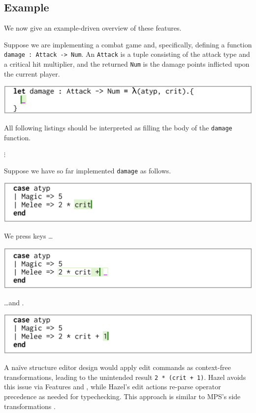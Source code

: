 \documentclass[format=sigplan,dvipsnames,backend=bibtex]{acmart}
\newcommand{\Hazel}{\textsf{Hazel}\xspace}
\newcommand{\key}[1]{\fbox{\texttt{#1}}}
\begin{document}
\subsection{Example}

We now give an example-driven overview of these features.


Suppose we are implementing a combat game and, specifically, defining a function
	\texttt{damage : Attack -> Num}. An \texttt{Attack} is a tuple consisting of the
	attack type and a critical hit multiplier, and the returned \texttt{Num} is the
	damage points inflicted upon the current player.
	
{\centering
  \includegraphics[width=\linewidth]{fig/context.png}\par
}
\noindent
All following listings should be interpreted as filling the body of the \texttt{damage} function.

{\centering
	\vspace{-0.1cm}
  $\vdots$\par
  \vspace{0.1cm}
}
\noindent
Suppose we have so far implemented \texttt{damage} as follows.

{\centering
  \includegraphics[width=\linewidth]{fig/frame1.png}\par
}
\noindent
We press keys \key{+} \ldots

{\centering
  \includegraphics[width=\linewidth]{fig/frame1-5.png}\par
}
\noindent
\ldots and \key{1}.

{\centering
  \includegraphics[width=\linewidth]{fig/frame2.png}\par
}
\noindent
A naïve structure editor design would apply edit commands as context-free transformations,
	leading to the unintended result \texttt{2 * (crit + 1)}.
\Hazel avoids this issue via Features  and , while \Hazel's edit actions
	re-parse operator precedence as needed for typechecking. 
This approach is similar to MPS's side transformations \cite{GrammarCells}.
\end{document}
